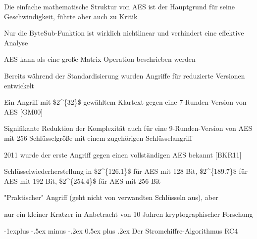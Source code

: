 \documentclass[a4paper]{article}
\makeatletter
\renewcommand{\subsection}{\@startsection{subsection}{2}{0mm}%
 {-1explus -.5ex minus -.2ex}%
 {0.5ex plus .2ex}%
 {\normalfont\normalsize\bfseries}}
\makeatother
\begin{document}
\begin{multicols}{3}
      \begin{itemize*}
            \item Die einfache mathematische Struktur von AES ist der Hauptgrund für
            seine Geschwindigkeit, führte aber auch zu Kritik
            \item Nur die ByteSub-Funktion ist wirklich nichtlinear und verhindert eine
            effektive Analyse
            \item AES kann als eine große Matrix-Operation beschrieben werden
            \item Bereits während der Standardisierung wurden Angriffe für reduzierte
            Versionen entwickelt
            \begin{itemize*}
                  \item Ein Angriff mit \$2\^{}\{32\}\$ gewähltem Klartext gegen eine 7-Runden-Version von AES {[}GM00{]}
                  \item Signifikante Reduktion der Komplexität auch für eine 9-Runden-Version von AES mit 256-Schlüsselgröße mit einem zugehörigen Schlüsselangriff
            \end{itemize*}
            \item 2011 wurde der erste Angriff gegen einen vollständigen AES bekannt
            {[}BKR11{]}
            \begin{itemize*}
                  \item Schlüsselwiederherstellung in \$2\^{}\{126.1\}\$ für AES mit 128 Bit, \$2\^{}\{189.7\}\$ für AES mit 192 Bit, \$2\^{}\{254.4\}\$ für AES mit 256 Bit
                  \item "Praktischer" Angriff (geht nicht von verwandten Schlüsseln aus), aber
                  \item nur ein kleiner Kratzer in Anbetracht von 10 Jahren kryptographischer Forschung
            \end{itemize*}
      \end{itemize*}


      \subsection{Der Stromchiffre-Algorithmus
            RC4}


\end{multicols}
\end{document}
